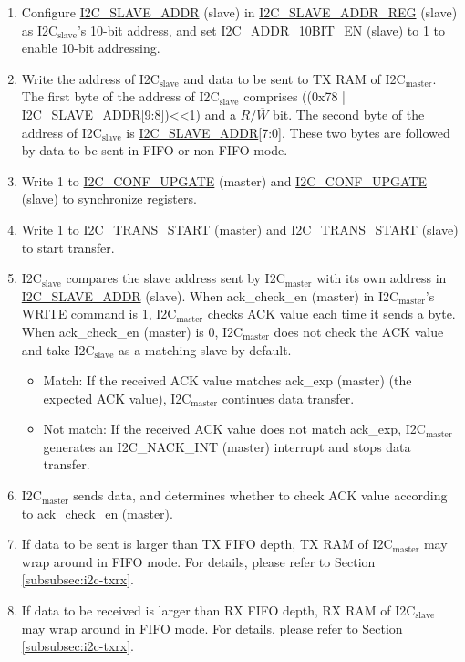 \documentclass[main\_\_EN.tex]{subfiles}
\begin{document}
\begin{enumerate}
\item Configure \hyperref[fielddesc:I2CSLAVEADDR]{I2C\_SLAVE\_ADDR} (slave) in \hyperref[regdesc:I2CSLAVEADDRREG]{I2C\_SLAVE\_ADDR\_REG} (slave) as I2C$_\text{slave}$'s 10-bit address, and set \hyperref[fielddesc:I2CADDR10BITEN]{I2C\_ADDR\_10BIT\_EN} (slave) to 1 to enable 10-bit addressing.
\item Write the address of I2C$_\text{slave}$ and data to be sent to TX RAM of I2C$_\text{master}$. The first byte of the address of I2C$_\text{slave}$ comprises ((0x78 | \hyperref[fielddesc:I2CSLAVEADDR]{I2C\_SLAVE\_ADDR}[9:8])<<1) and a $R/\overline W$ bit. The second byte of the address of I2C$_\text{slave}$ is \hyperref[fielddesc:I2CSLAVEADDR]{I2C\_SLAVE\_ADDR}[7:0]. These two bytes are followed by data to be sent in FIFO or non-FIFO mode.
\item Write 1 to \hyperref[fielddesc:I2CCONFUPGATE]{I2C\_CONF\_UPGATE} (master) and \hyperref[fielddesc:I2CCONFUPGATE]{I2C\_CONF\_UPGATE} (slave) to synchronize registers.
\item Write 1 to \hyperref[fielddesc:I2CTRANSSTART]{I2C\_TRANS\_START} (master) and \hyperref[fielddesc:I2CTRANSSTART]{I2C\_TRANS\_START} (slave) to start transfer.
\item I2C$_\text{slave}$ compares the slave address sent by I2C$_\text{master}$ with its own address in \hyperref[fielddesc:I2CSLAVEADDR]{I2C\_SLAVE\_ADDR} (slave). When ack\_check\_en (master) in I2C$_\text{master}$'s WRITE command is 1, I2C$_\text{master}$ checks ACK value each time it sends a byte. When ack\_check\_en (master) is 0, I2C$_\text{master}$ does not check the ACK value and take I2C$_\text{slave}$ as a matching slave by default.
\begin{itemize}
\item Match: If the received ACK value matches ack\_exp (master) (the expected ACK value), I2C$_\text{master}$ continues data transfer.
\item Not match: If the received ACK value does not match ack\_exp, I2C$_\text{master}$ generates an I2C\_NACK\_INT (master) interrupt and stops data transfer.
\end{itemize}

\item I2C$_\text{master}$ sends data, and determines whether to check ACK value according to ack\_check\_en (master).
\item If data to be sent is larger than TX FIFO depth, TX RAM of I2C$_\text{master}$ may wrap around in FIFO mode. For details, please refer to Section \ref{subsubsec:i2c-txrx}.
\item If data to be received is larger than RX FIFO depth, RX RAM of I2C$_\text{slave}$ may wrap around in FIFO mode. For details, please refer to Section \ref{subsubsec:i2c-txrx}.


\end{enumerate}
\end{document}
